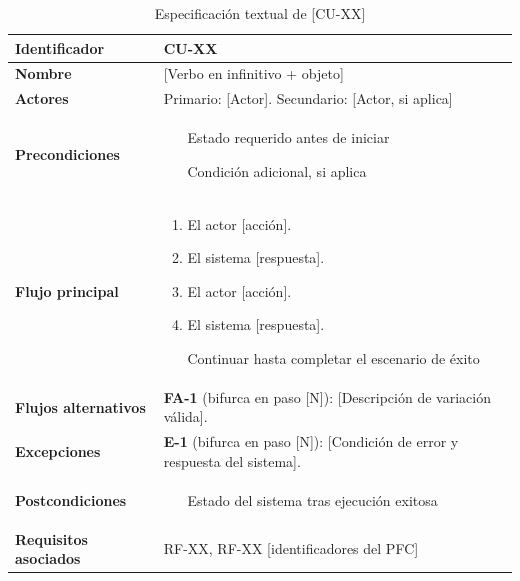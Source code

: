 \documentclass[journal,onecolumn]{IEEEtran}
\begin{document}
\begin{table}[H]
\caption{Especificación textual de [CU-XX]}
\label{tab:cu01}
\begin{tabularx}{\textwidth}{|l|X|}
\hline
\textbf{Identificador}       & CU-XX \\
\hline
\textbf{Nombre}              & [Verbo en infinitivo + objeto] \\
\hline
\textbf{Actores}             & Primario: [Actor]. Secundario: [Actor, si aplica] \\
\hline
\textbf{Precondiciones}      & \begin{enumerate}[leftmargin=*,topsep=0pt]
                                 \item [Estado requerido antes de iniciar]
                                 \item [Condición adicional, si aplica]
                               \end{enumerate} \\
\hline
\textbf{Flujo principal}     & \begin{enumerate}[leftmargin=*,topsep=0pt]
                                 \item El actor [acción].
                                 \item El sistema [respuesta].
                                 \item El actor [acción].
                                 \item El sistema [respuesta].
                                 \item [Continuar hasta completar el escenario de éxito]
                               \end{enumerate} \\
\hline
\textbf{Flujos alternativos} & \textbf{FA-1} (bifurca en paso [N]): [Descripción de variación válida]. \\
\hline
\textbf{Excepciones}         & \textbf{E-1} (bifurca en paso [N]): [Condición de error y respuesta del sistema]. \\
\hline
\textbf{Postcondiciones}     & \begin{enumerate}[leftmargin=*,topsep=0pt]
                                 \item [Estado del sistema tras ejecución exitosa]
                               \end{enumerate} \\
\hline
\textbf{Requisitos asociados} & RF-XX, RF-XX [identificadores del PFC] \\
\hline
\end{tabularx}
\end{table}
\end{document}
